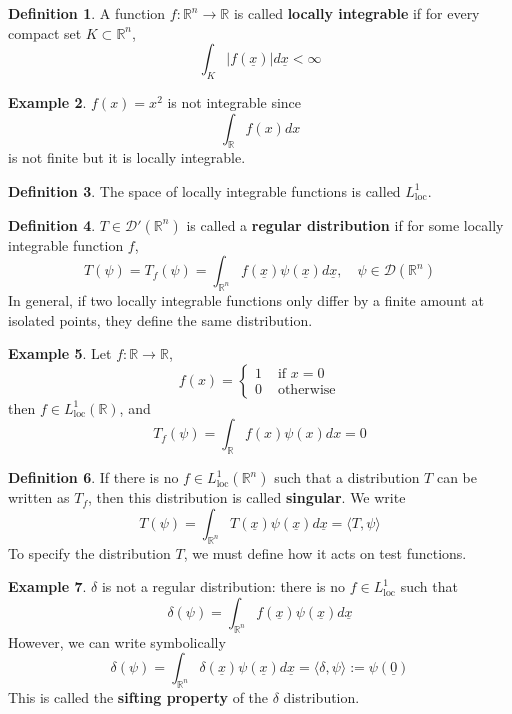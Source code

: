 \documentclass[12pt,a4paper]{article}
\theoremstyle{definition}
\newtheorem{definition}{Definition}[subsection]
\newtheorem{example}[definition]{Example}
\begin{document}
\begin{definition}
	A function $f: \mathbb{R}^n \rightarrow \mathbb{R}$ is called \textbf{locally integrable} if for every compact set $K \subset \mathbb{R}^n$,
	\[
		\int_K |f(\underline{x})| d\underline{x} < \infty
	\]
\end{definition}

\begin{example}
	$f(x) = x^2$ is not integrable since
	\[
		\int_{\mathbb{R}} f(x) dx
	\]
	is not finite but it is locally integrable.
\end{example}

\begin{definition}
	The space of locally integrable functions is called $L_{\text{loc}}^1$.
\end{definition}

\begin{definition}
	$T \in \mathcal{D}'(\mathbb{R}^n)$ is called a \textbf{regular distribution} if for some locally integrable function $f$,
	\[
		T(\psi) = T_f(\psi) = \int_{\mathbb{R}^n} f(\underline{x}) \psi(\underline{x}) d\underline{x}, \quad \psi \in \mathcal{D}(\mathbb{R}^n)
	\]
	In general, if two locally integrable functions only differ by a finite amount at isolated points, they define the same distribution.
\end{definition}

\begin{example}
	Let $f: \mathbb{R} \rightarrow \mathbb{R}$,
	\[
		f(x) = \begin{cases}
			1 & \text{ if } x = 0 \\
			0 & \text{ otherwise}
		\end{cases}
	\]
	then $f \in L_{\text{loc}}^1 (\mathbb{R})$, and
	\[
		T_f(\psi) = \int_{\mathbb{R}} f(x) \psi(x) dx = 0
	\]
\end{example}

\begin{definition}
	If there is no $f \in L_{\text{loc}}^1 (\mathbb{R}^n)$ such that a distribution $T$ can be written as $T_f$, then this distribution is called \textbf{singular}. We write
	\[
		T(\psi) = \int_{\mathbb{R}^n} T(\underline{x}) \psi(\underline{x}) d\underline{x} = \langle T, \psi \rangle
	\]
	To specify the distribution $T$, we must define how it acts on test functions.
\end{definition}

\begin{example}
	$\delta$ is not a regular distribution: there is no $f \in L_{\text{loc}}^1$ such that
	\[
		\delta(\psi) = \int_{\mathbb{R}^n} f(\underline{x}) \psi(\underline{x}) d\underline{x}
	\]
	However, we can write symbolically
	\[
		\delta(\psi) = \int_{\mathbb{R}^n} \delta(\underline{x}) \psi(\underline{x}) d\underline{x} = \langle \delta, \psi \rangle := \psi(\underline{0})
	\]
	This is called the \textbf{sifting property} of the $\delta$ distribution.
\end{example}
\end{document}
